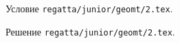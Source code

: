 Условие \texttt{regatta/junior/geomt/2.tex}.

\solution Решение \texttt{regatta/junior/geomt/2.tex}.
